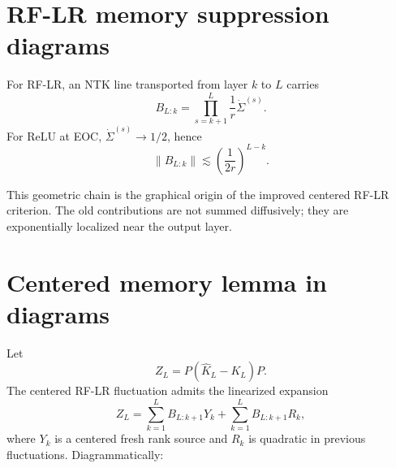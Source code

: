 \documentclass[11pt]{article}
\begin{document}
\section{RF-LR memory suppression diagrams}

For RF-LR, an NTK line transported from layer $k$ to $L$ carries
\begin{equation}
B_{L:k}=\prod_{s=k+1}^L \frac1r\dot\Sigma^{(s)}.
\end{equation}
For ReLU at EOC, $\dot\Sigma^{(s)}\to 1/2$, hence
\begin{equation}
\|B_{L:k}\|\lesssim \left(\frac1{2r}\right)^{L-k}.
\end{equation}

\begin{center}
\end{center}

This geometric chain is the graphical origin of the improved centered RF-LR criterion.  The old contributions are not summed diffusively; they are exponentially localized near the output layer.

\section{Centered memory lemma in diagrams}

Let
\[
Z_L=P(\widehat K_L-K_L)P.
\]
The centered RF-LR fluctuation admits the linearized expansion
\begin{equation}
Z_L=\sum_{k=1}^L B_{L:k+1}Y_k+\sum_{k=1}^L B_{L:k+1}R_k,
\label{eq:centered-expansion}
\end{equation}
where $Y_k$ is a centered fresh rank source and $R_k$ is quadratic in previous fluctuations.  Diagrammatically:

\begin{center}
\end{center}
\end{document}
